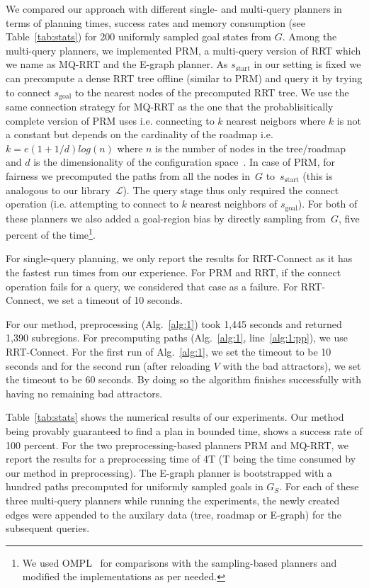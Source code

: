 \documentclass[letterpaper]{article} %
\newcommand{\calL}{\ensuremath{\mathcal{L}}\xspace}
\newcommand{\sStart}{\ensuremath{s_{\text{start}}\xspace}}
\newcommand{\sGoal}{\ensuremath{s_{\text{goal}}\xspace}}
\begin{document}
We compared our approach with different single- and multi-query planners in terms of planning times, success rates and memory consumption (see Table~\ref{tab:stats}) for 200 uniformly sampled goal states from $G$. Among the multi-query planners, we implemented \textsf{PRM}, a multi-query version of \textsf{RRT} which we name as MQ-RRT and the E-graph planner. As $\sStart$ in our setting is fixed we can precompute a dense RRT tree offline (similar to PRM) and query it by trying to connect $\sGoal$ to the nearest nodes of the precomputed RRT tree. We use the same connection strategy for MQ-RRT as the one that the probablisitically complete version of PRM uses i.e. connecting to $k$ nearest neigbors where $k$ is not a constant but depends on the cardinality of the roadmap i.e. $k = e(1+1/d)log(n)$ where $n$ is the number of nodes in the tree/roadmap and $d$ is the dimensionality of the configuration space~\cite{karaman2011sampling}. 
In case of \textsf{PRM}, for fairness we precomputed the paths from all the nodes in~$G$ to~$s_{\text{start}}$ (this is analogous to our library~$\calL$). 
The query stage thus only required the connect operation (i.e. attempting to connect to $k$ nearest neighbors of $\sGoal$). For both of these planners we also added a goal-region bias by directly sampling from~$G$, five percent of the time\footnote{We used OMPL~\cite{SMK12} for comparisons with the sampling-based planners and modified the implementations as per needed.}. 

For single-query planning, we only report the results for \textsf{RRT}-Connect as it has the fastest run times from our experience. For \textsf{PRM} and \textsf{RRT}, if the connect operation fails for a query, we considered that case as a failure. For \textsf{RRT}-Connect, we set a timeout of 10 seconds.

For our method, preprocessing (Alg.~\ref{alg:1}) took 1,445 seconds and returned 1,390 subregions. For precomputing paths (Alg.~\ref{alg:1}, line~\ref{alg:1:pp}), we use \textsf{RRT}-Connect. For the first run of Alg.~\ref{alg:1}, we set the timeout to be 10 seconds and for the second run (after reloading $V$ with the bad attractors), we set the timeout to be 60 seconds. By doing so the algorithm finishes successfully with having no remaining bad attractors.

Table~\ref{tab:stats} shows the numerical results of our experiments. Our method being provably guaranteed to find a plan in bounded time, shows a success rate of 100 percent. For the two preprocessing-based planners PRM and MQ-RRT, we report the results for a preprocessing time of 4T (T being the time consumed by our method in preprocessing). The E-graph planner is bootstrapped with a hundred paths precomputed for uniformly sampled goals in $G_S$. For each of these three multi-query planners while running the experiments, the newly created edges were appended to the auxilary data (tree, roadmap or E-graph) for the subsequent queries.
\end{document}

